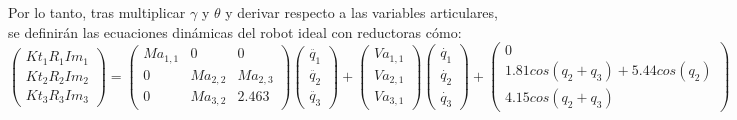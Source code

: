 Por lo tanto, tras multiplicar $\gamma$ y $\theta$ y derivar respecto a las variables articulares, se definirán las ecuaciones dinámicas del robot ideal con reductoras cómo:\\

\[
\begin{pmatrix}
Kt_{1}R_{1}Im_{1} \\

Kt_{2}R_{2}Im_{2} \\

Kt_{3}R_{3}Im_{3}
\end{pmatrix} =
\begin{pmatrix}
Ma_{1,1} & 0 & 0 \\

0 & Ma_{2,2} & Ma_{2,3}\\

0 & Ma_{3,2} & 2.463
\end{pmatrix}
\begin{pmatrix}
\ddot{q_{1}} \\

\ddot{q_{2}}  \\

\ddot{q_{3}}
\end{pmatrix} +
\begin{pmatrix}
Va_{1,1}\\

Va_{2,1} \\

Va_{3,1}
\end{pmatrix}
\begin{pmatrix}
\dot{q_{1}} \\

\dot{q_{2}}  \\

\dot{q_{3}}
\end{pmatrix} +
\begin{pmatrix}
0 \\

1.81cos(q_{2} + q_{3}) + 5.44cos(q_{2}) \\

4.15cos(q_{2} + q_{3})
\end{pmatrix}\]



